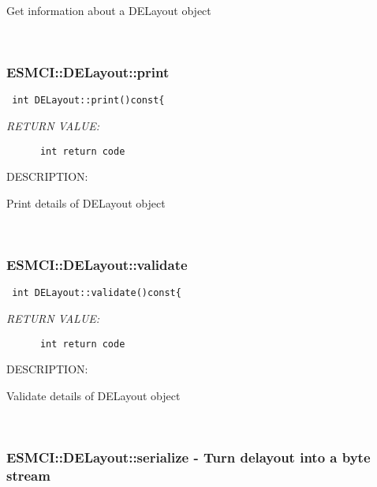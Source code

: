       Get information about a DELayout object
   
 
\mbox{}\hrulefill\
 
\subsubsection [ESMCI::DELayout::print] {ESMCI::DELayout::print}


  
\begin{verbatim} int DELayout::print()const{\end{verbatim}{\em RETURN VALUE:}
\begin{verbatim}      int return code\end{verbatim}
{\sf DESCRIPTION:\\ }


      Print details of DELayout object
   
 
\mbox{}\hrulefill\
 
\subsubsection [ESMCI::DELayout::validate] {ESMCI::DELayout::validate}


  
\begin{verbatim} int DELayout::validate()const{\end{verbatim}{\em RETURN VALUE:}
\begin{verbatim}      int return code\end{verbatim}
{\sf DESCRIPTION:\\ }


      Validate details of DELayout object
   
 
\mbox{}\hrulefill\
 
\subsubsection [ESMCI::DELayout::serialize] {ESMCI::DELayout::serialize - Turn delayout into a byte stream}


